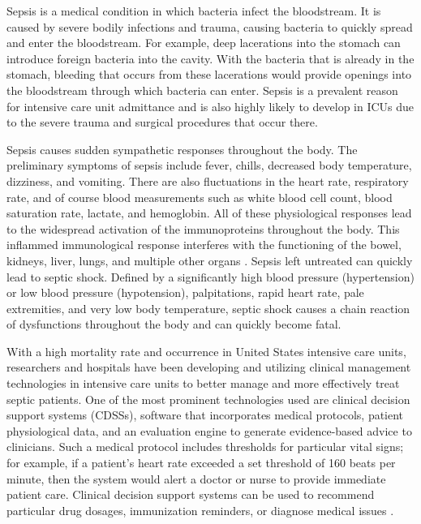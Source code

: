 \documentclass{sig-alternate}
\begin{document}
Sepsis is a medical condition in which bacteria infect the bloodstream. It is caused by severe bodily infections and trauma, causing bacteria to quickly spread and enter the bloodstream. For example, deep lacerations into the stomach can introduce foreign bacteria into the cavity. With the bacteria that is already in the stomach, bleeding that occurs from these lacerations would provide openings into the bloodstream through which bacteria can enter. Sepsis is a prevalent reason for intensive care unit admittance and is also highly likely to develop in ICUs due to the severe trauma and surgical procedures that occur there. 

Sepsis causes sudden sympathetic responses throughout the body. The preliminary symptoms of sepsis include fever, chills, decreased body temperature, dizziness, and vomiting. There are also fluctuations in the heart rate, respiratory rate, and of course blood measurements such as white blood cell count, blood saturation rate, lactate, and hemoglobin. All of these physiological responses lead to the widespread activation of the immunoproteins throughout the body. This inflammed immunological response interferes with the functioning of the bowel, kidneys, liver, lungs, and multiple other organs \cite{statins}. Sepsis left untreated can quickly lead to septic shock. Defined by a significantly high blood pressure (hypertension) or low blood pressure (hypotension), palpitations, rapid heart rate, pale extremities, and very low body temperature, septic shock causes a chain reaction of dysfunctions throughout the body and can quickly become fatal.

With a high mortality rate and occurrence in United States intensive care units, researchers and hospitals have been developing and utilizing clinical management technologies in intensive care units to better manage and more effectively treat septic patients. One of the most prominent technologies used are clinical decision support systems (CDSSs), software that incorporates medical protocols, patient physiological data, and an evaluation engine to generate evidence-based advice to clinicians. Such a medical protocol includes thresholds for particular vital signs; for example, if a patient's heart rate exceeded a set threshold of 160 beats per minute, then the system would alert a doctor or nurse to provide immediate patient care. Clinical decision support systems can be used to recommend particular drug dosages, immunization reminders, or diagnose medical issues \cite{ssc}. 

\vspace{10pt}
\end{document}
